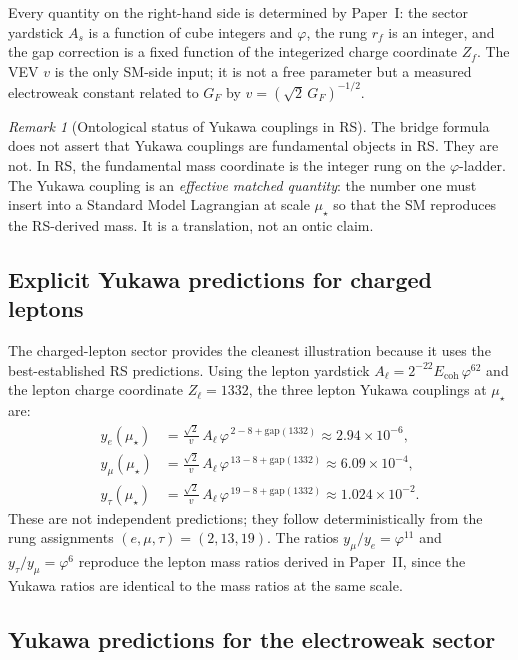\documentclass[11pt]{article}
\theoremstyle{remark}
\newtheorem{remark}[theorem]{Remark}
\newcommand{\phig}{\varphi}
\newcommand{\mustar}{\mu_\star}
\newcommand{\Ecoh}{E_{\mathrm{coh}}}
\begin{document}
Every quantity on the right-hand side is determined by Paper~I:
the sector yardstick $A_s$ is a function of cube integers and
$\phig$, the rung $r_f$ is an integer, and the gap correction
is a fixed function of the integerized charge coordinate $Z_f$.
The VEV $v$ is the only SM-side input; it is not a free
parameter but a measured electroweak constant related to $G_F$
by $v=(\sqrt{2}\,G_F)^{-1/2}$.

\begin{remark}[Ontological status of Yukawa couplings in RS]
The bridge formula does not assert that Yukawa couplings are
fundamental objects in RS.  They are not.  In RS, the
fundamental mass coordinate is the integer rung on the
$\phig$-ladder.  The Yukawa coupling is an \emph{effective
matched quantity}: the number one must insert into a Standard
Model Lagrangian at scale $\mustar$ so that the SM reproduces
the RS-derived mass.  It is a translation, not an ontic claim.
\end{remark}

\subsection{Explicit Yukawa predictions for charged leptons}

The charged-lepton sector provides the cleanest illustration
because it uses the best-established RS predictions.  Using the
lepton yardstick $A_\ell = 2^{-22}\Ecoh\,\phig^{62}$ and the
lepton charge coordinate $Z_\ell = 1332$, the three lepton
Yukawa couplings at $\mustar$ are:
\begin{align}
  y_e(\mustar)
  &= \frac{\sqrt{2}}{v}\,
     A_\ell\,\phig^{\,2 - 8 + \mathrm{gap}(1332)}
  \approx 2.94 \times 10^{-6},
  \label{eq:ye} \\
  y_\mu(\mustar)
  &= \frac{\sqrt{2}}{v}\,
     A_\ell\,\phig^{\,13 - 8 + \mathrm{gap}(1332)}
  \approx 6.09 \times 10^{-4},
  \label{eq:ymu} \\
  y_\tau(\mustar)
  &= \frac{\sqrt{2}}{v}\,
     A_\ell\,\phig^{\,19 - 8 + \mathrm{gap}(1332)}
  \approx 1.024 \times 10^{-2}.
  \label{eq:ytau}
\end{align}
These are not independent predictions; they follow
deterministically from the rung assignments $(e,\mu,\tau)=(2,13,19)$.
The ratios $y_\mu/y_e = \phig^{11}$ and
$y_\tau/y_\mu = \phig^{6}$ reproduce the lepton mass ratios
derived in Paper~II, since the Yukawa ratios are identical to
the mass ratios at the same scale.

\subsection{Yukawa predictions for the electroweak sector}
\end{document}
